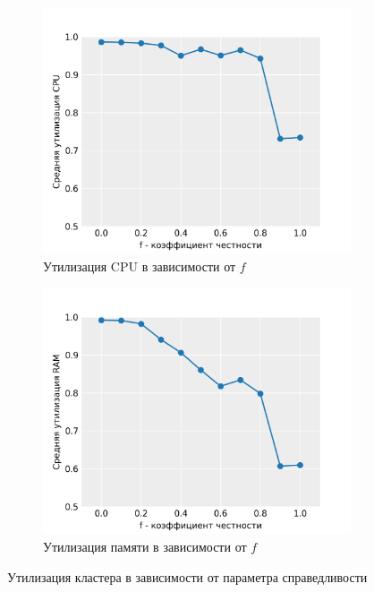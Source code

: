 \begin{figure}[h!]
    \centering 
    \begin{subfigure}{0.49\linewidth}
        \centering
        \includegraphics[width=\linewidth]{images/cpu_utilization}
        \caption{Утилизация CPU в зависимости от $f$}
    \end{subfigure}
    \begin{subfigure}{0.49\linewidth}
        \centering
        \includegraphics[width=\linewidth]{images/memory_utilization}
        \caption{Утилизация памяти в зависимости от $f$}
    \end{subfigure}
    \caption{Утилизация кластера в зависимости от параметра справедливости}
    \label{fig:utilization-results}
\end{figure}

